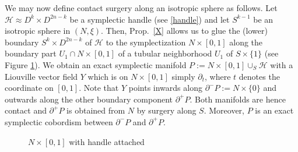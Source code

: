 \documentclass[a4paper,12pt,bibliography=totocnumbered,titlepage=false,abstracton,bookmarksnumbered=true]{scrartcl}
\theoremstyle{definition}
\begin{document}
We may now define contact surgery along an isotropic sphere as follows. Let $\mathcal{H}\approx D^k{\times} D^{2n-k}$ be a symplectic handle (see \ref{handle}) and let $S^{k-1}$ be an isotropic sphere in $(N,\xi)$. Then, Prop.\ \ref{X} allows us to glue the (lower) boundary $S^k{\times} D^{2n-k}$ of $\mathcal{H}$ to the symplectization $N\times[0,1]$ along the boundary part $U_1\cap N{\times}[0,1]$ of a tubular neighborhood $U_1$ of $S{\times}\{1\}$ (see Figure \ref{fig2}). We obtain an exact symplectic manifold $P:=N{\times}[0,1]\cup_{S}\mathcal{H}$ with a Liouville vector field $Y$ which is on $N\times[0,1]$ simply $\partial_t$, where $t$ denotes the coordinate on $[0,1]$. Note that $Y$ points inwards along $\partial^-P :=N{\times}\{0\}$ and outwards along the other boundary component $\partial^+P$. Both manifolds are hence contact and $\partial^+P$ is obtained from $N$ by surgery along $S$. Moreover, $P$ is an exact symplectic cobordism between $\partial^-P$ and $\partial^+P$.
\begin{figure}[ht]
\centering 
 \resizebox{7cm}{!}{}
 \caption{\label{fig2} $N\times[0,1]$ with handle attached}
\end{figure}
\end{document}
